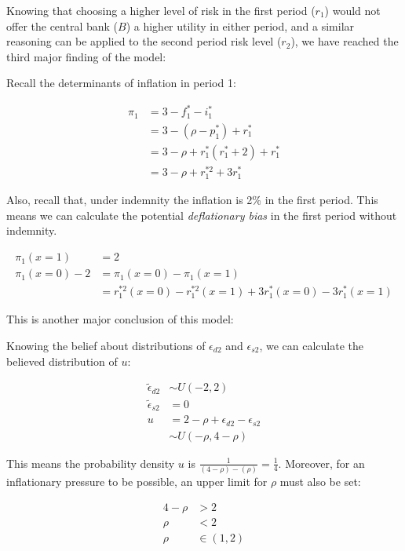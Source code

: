 \documentclass[
  a4paper,
  abstract=true]{scrartcl}
\theoremstyle{definition}
\begin{document}
Knowing that choosing a higher level of risk in the first period
(\(r_1\)) would not offer the central bank (\(B\)) a higher utility in
either period, and a similar reasoning can be applied to the second
period risk level (\(r_2\)), we have reached the third major finding of
the model:

\prudence*

Recall the determinants of inflation in period 1:

\begin{align*}
\pi_1&=3-f_1^*-i_1^* \\
&=3-(\rho-p_1^*)+r_1^* \\
&=3-\rho+r_1^*(r_1^*+2)+r_1^*\\
&=3-\rho+r_1^{*2}+3r_1^*
\end{align*}

Also, recall that, under indemnity the inflation is 2\% in the first
period. This means we can calculate the potential \emph{deflationary
bias} in the first period without indemnity.

\begin{align*}
\pi_1(x=1)&=2 \\
\pi_1(x=0)-2&=\pi_1(x=0)-\pi_1(x=1) \\
&=r_1^{*2}(x=0)-r_1^{*2}(x=1)+3r_1^*(x=0)-3r_1^*(x=1)
\end{align*}

This is another major conclusion of this model:


Knowing the belief about distributions of \(\epsilon_{d2}\) and
\(\epsilon_{s2}\), we can calculate the believed distribution of \(u\):

\begin{align*}
\tilde\epsilon_{d2}& \sim U(-2,2) \\
\tilde\epsilon_{s2}& =0 \\
u&=2-\rho+\epsilon_{d2}-\epsilon_{s2} \\
&\sim U(-\rho, 4-\rho)
\end{align*}

This means the probability density \(u\) is
\(\frac{1}{(4-\rho)-(\rho)}=\frac{1}{4}\). Moreover, for an inflationary
pressure to be possible, an upper limit for \(\rho\) must also be set:

\begin{align}
4-\rho&>2\nonumber \\
\rho&<2 \nonumber\\
\rho&\in(1,2) \label{eq-rho-range}
\end{align}
\end{document}
